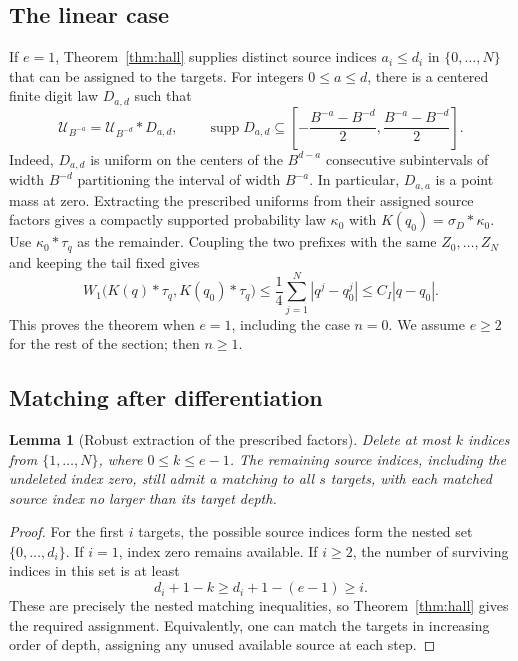 \documentclass[11pt,letterpaper]{article}
\newtheorem{lemma}[theorem]{Lemma}
\theoremstyle{definition}
\theoremstyle{remark}
\newcommand{\Un}{\mathcal U}
\newcommand{\supp}{\operatorname{supp}}
\begin{document}
\subsection{The linear case}

If $e=1$, Theorem~\ref{thm:hall} supplies distinct source indices
$a_i\le d_i$ in $\{0,\ldots,N\}$ that can be assigned to the targets.
For integers $0\le a\le d$, there is a centered finite digit law $D_{a,d}$
such that
\begin{equation}\label{upper:subdivision}
 \Un_{B^{-a}}=\Un_{B^{-d}}*D_{a,d},\qquad
 \supp D_{a,d}\subseteq
 \left[-\frac{B^{-a}-B^{-d}}2,\frac{B^{-a}-B^{-d}}2\right].
\end{equation}
Indeed, $D_{a,d}$ is uniform on the centers of the $B^{d-a}$ consecutive
subintervals of width $B^{-d}$ partitioning the interval of width $B^{-a}$.
In particular, $D_{a,a}$ is a point mass at zero.  Extracting the prescribed
uniforms from their assigned source factors gives a compactly supported
probability law $\kappa_0$ with $K(q_0)=\sigma_D*\kappa_0$.
Use $\kappa_0*\tau_q$ as the remainder.  Coupling the two prefixes with
the same $Z_0,\ldots,Z_N$ and keeping the tail fixed gives
\[
 W_1\bigl(K(q)*\tau_q,K(q_0)*\tau_q\bigr)
 \le\frac14\sum_{j=1}^N|q^j-q_0^j|
 \le C_I|q-q_0|.
\]
This proves the theorem when $e=1$, including the case $n=0$.
We assume $e\ge2$ for the rest of the section; then $n\ge1$.

\subsection{Matching after differentiation}

\begin{lemma}[Robust extraction of the prescribed factors]
\label{upper:robust-matching}
Delete at most $k$ indices from $\{1,\ldots,N\}$, where
$0\le k\le e-1$.  The remaining source indices, including the undeleted
index zero, still admit a matching to all $s$ targets, with each matched
source index no larger than its target depth.
\end{lemma}
\begin{proof}
For the first $i$ targets, the possible source indices form the nested set
$\{0,\ldots,d_i\}$.  If $i=1$, index zero remains available.  If $i\ge2$,
the number of surviving indices in this set is at least
\[
 d_i+1-k\ge d_i+1-(e-1)\ge i.
\]
These are precisely the nested matching inequalities, so
Theorem~\ref{thm:hall} gives the required assignment.  Equivalently, one can
match the targets in increasing order of depth, assigning any unused
available source at each step.
\end{proof}
\end{document}
